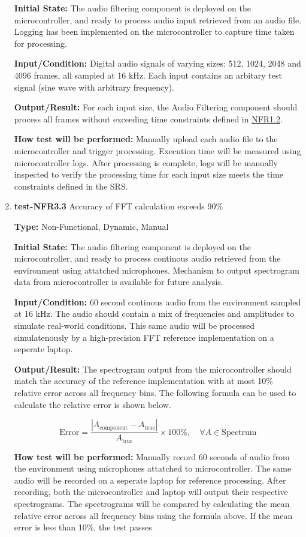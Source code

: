 \documentclass[12pt, titlepage]{article}
\begin{document}
\begin{enumerate}
\textbf{Initial State:} 
The audio filtering component is deployed on the microcontroller, and ready to 
process audio input retrieved from an audio file. Logging has been 
implemented on the microcontroller to capture time taken for processing.
					
\textbf{Input/Condition:} 
Digital audio signals of varying sizes: 512, 1024, 2048 and 4096 frames, all 
sampled at 16 kHz. Each input contains an arbitary test signal (sine wave with 
arbitrary frequency). 
					
\textbf{Output/Result:} 
For each input size, the Audio Filtering component should process all frames 
without exceeding time constraints defined in \hyperref[SRS-NFR1_2]{NFR1.2}. 
					
\textbf{How test will be performed:} 
Manually upload each audio file to the microcontroller and trigger processing. 
Execution time will be measured using microcontroller logs. After processing
 is complete, logs will be manually inspected to verify the processing time
 for each input size meets the time constraints defined in the SRS.

\item{\textbf{test-NFR3.3} Accuracy of FFT calculation exceeds 90\%\\}

\textbf{Type:} Non-Functional, Dynamic, Manual
					
\textbf{Initial State:} 
The audio filtering component is deployed on the microcontroller, and ready to 
process continous audio retrieved from the environment using attatched 
microphones. Mechanism to output spectrogram data from microcontroller is 
available for future analysis.
					
\textbf{Input/Condition:} 
60 second continous audio from the environment sampled at 16 kHz. The audio 
should contain a mix of frequencies and amplitudes to simulate real-world 
conditions. This same audio will be processed simulatenously by a high-precision 
FFT reference implementation on a seperate laptop.
					
\textbf{Output/Result:} 
The spectrogram output from the microcontroller should match the accuracy of 
the reference implementation with at most 10\% relative error across all 
frequency bins. The following formula can be used to calculate the relative 
error is shown below. 

\[
\text{Error} = \frac{\left|A_{\text{component}} - A_{\text{true}}\right|}{A_{\text{true}}} \times 100\%, 
\quad \forall A \in \text{Spectrum}
\]

\textbf{How test will be performed:} 
Manually record 60 seconds of audio from the environment using microphones 
attatched to microcontroller. The same audio will be recorded on a seperate 
laptop for reference processing. After recording, both the microcontroller and 
laptop will output their respective spectrograms. The spectrograms will be
compared by calculating the mean relative error across all frequency bins
using the formula above. If the mean error is less than 10\%, the test passes

\end{enumerate}
\end{document}
